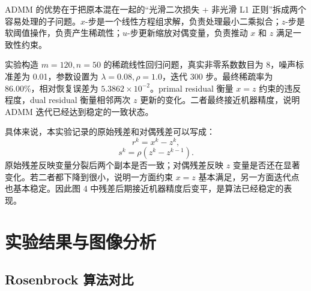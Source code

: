 \documentclass[UTF8,a4paper,12pt,fontset=none]{ctexart}
\begin{document}
ADMM 的优势在于把原本混在一起的“光滑二次损失 + 非光滑 L1 正则”拆成两个容易处理的子问题。$x$-步是一个线性方程组求解，负责处理最小二乘拟合；$z$-步是软阈值操作，负责产生稀疏性；$u$-步更新缩放对偶变量，负责推动 $x$ 和 $z$ 满足一致性约束。

实验构造 $m=120,n=50$ 的稀疏线性回归问题，真实非零系数数目为 8，噪声标准差为 0.01，参数设置为 $\lambda=0.08,\rho=1.0$，迭代 300 步。最终稀疏率为 86.00\%，相对恢复误差为 $5.3862\times10^{-2}$。primal residual 衡量 $x=z$ 约束的违反程度，dual residual 衡量相邻两次 $z$ 更新的变化。二者最终接近机器精度，说明 ADMM 迭代已经达到稳定的一致状态。

具体来说，本实验记录的原始残差和对偶残差可以写成：
\[
r^k=x^k-z^k,
\]
\[
s^k=\rho(z^k-z^{k-1}).
\]
原始残差反映变量分裂后两个副本是否一致；对偶残差反映 $z$ 变量是否还在显著变化。若二者都下降到很小，说明一方面约束 $x=z$ 基本满足，另一方面迭代点也基本稳定。因此图 4 中残差后期接近机器精度后变平，是算法已经稳定的表现。

\section{实验结果与图像分析}

\subsection{Rosenbrock 算法对比}

\begin{table}[H]
\centering
\scriptsize
{}
\caption{Rosenbrock 函数上不同算法的收敛结果}
\end{table}
\end{document}
